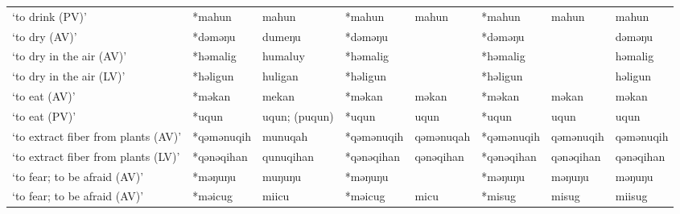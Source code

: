 \begin{landscape}
\begin{longtable}[c]{@{}p{3cm}<{\raggedright}p{2.75cm}<{\raggedright}p{2.75cm}<{\raggedright}p{2.75cm}<{\raggedright}p{2.75cm}<{\raggedright}p{2.75cm}<{\raggedright}p{2.75cm}<{\raggedright}p{2.75cm}<{\raggedright}@{}}
`to drink (PV)'                                      & *mahun       & mahun                         & *mahun         & mahun                      & *mahun           & mahun                    & mahun                             \\
`to dry (AV)'                                        & *dəməŋu      & dumeŋu                        & *dəməŋu        &                            & *dəməŋu          &                          & dəməŋu                            \\
`to dry in the air (AV)'                             & *həmalig     & humaluy                       & *həmalig       &                            & *həmalig         &                          & həmalig                           \\
`to dry in the air (LV)'                             & *həligun     & huligan                       & *həligun       &                            & *həligun         &                          & həligun                           \\
`to eat (AV)'                                        & *məkan       & mekan                         & *məkan         & məkan                      & *məkan           & məkan                    & məkan                             \\
`to eat (PV)'                                        & *uqun        & uqun; (puqun)                 & *uqun          & uqun                       & *uqun            & uqun                     & uqun                              \\
`to extract fiber from plants (AV)'                  & *qəmənuqih   & munuqah                       & *qəmənuqih     & qəmənuqah                  & *qəmənuqih       & qəmənuqih                & qəmənuqih                         \\
`to extract fiber from plants (LV)'                  & *qənəqihan   & qunuqihan                     & *qənəqihan     & qənəqihan                  & *qənəqihan       & qənəqihan                & qənəqihan                         \\
`to fear; to be afraid (AV)'                         & *məŋuŋu      & muŋuŋu                        & *məŋuŋu        &                            & *məŋuŋu          & məŋuŋu                   & məŋuŋu                            \\
`to fear; to be afraid (AV)'                         & *məicug      & miicu                         & *məicug        & micu                       & *misug           & misug                    & miisug                            \\

\end{longtable}
\end{landscape}
